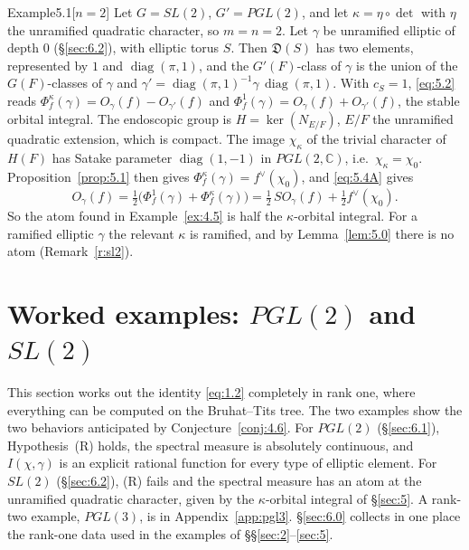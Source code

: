 \documentclass[12pt,letterpaper]{article}
\numberwithin{equation}{section}
\theoremstyle{plain}
\theoremstyle{remark}
\theoremstyle{plain}
\theoremstyle{definition}
\theoremstyle{remark}
\theoremstyle{remark}
\DeclareMathOperator{\diag}{diag}
\begin{document}
\begin{fixedrem}{Example}{5.1}[$n=2$]\label{ex:5.1}
Let $G=SL(2)$, $G'=PGL(2)$, and let $\kappa=\eta\circ\det$ with $\eta$ the unramified quadratic character, so $m=n=2$. Let $\gamma$ be unramified elliptic of depth $0$ (\S\ref{sec:6.2}), with elliptic torus $S$. Then $\mathfrak D(S)$ has two elements, represented by $1$ and $\diag(\pi,1)$, and the $G'(F)$-class of $\gamma$ is the union of the $G(F)$-classes of $\gamma$ and $\gamma'=\diag(\pi,1)^{-1}\gamma\,\diag(\pi,1)$. With $c_S=1$, \eqref{eq:5.2} reads $\Phi^\kappa_f(\gamma)=O_\gamma(f)-O_{\gamma'}(f)$ and $\Phi^1_f(\gamma)=O_\gamma(f)+O_{\gamma'}(f)$, the stable orbital integral. The endoscopic group is $H=\ker(N_{E/F})$, $E/F$ the unramified quadratic extension, which is compact. The image $\chi_\kappa$ of the trivial character of $H(F)$ has Satake parameter $\diag(1,-1)$ in $PGL(2,\mathbb{C})$, i.e.\ $\chi_\kappa=\chi_0$. Proposition~\ref{prop:5.1} then gives $\Phi^\kappa_f(\gamma)=f^\vee(\chi_0)$, and \eqref{eq:5.4A} gives
\[
O_\gamma(f)=\tfrac12\big(\Phi^1_f(\gamma)+\Phi^\kappa_f(\gamma)\big)=\tfrac12\,SO_\gamma(f)+\tfrac12f^\vee(\chi_0).
\]
So the atom found in Example~\ref{ex:4.5} is half the $\kappa$-orbital integral. For a ramified elliptic $\gamma$ the relevant $\kappa$ is ramified, and by Lemma~\ref{lem:5.0} there is no atom (Remark~\ref{r:sl2}).
\end{fixedrem}

\section{Worked examples: \texorpdfstring{$PGL(2)$}{PGL(2)} and \texorpdfstring{$SL(2)$}{SL(2)}}\label{sec:6}

This section works out the identity \eqref{eq:1.2} completely in rank one, where everything can be computed on the Bruhat--Tits tree. The two examples show the two behaviors anticipated by Conjecture~\ref{conj:4.6}. For $PGL(2)$ (\S\ref{sec:6.1}), Hypothesis~(R) holds, the spectral measure is absolutely continuous, and $I(\chi,\gamma)$ is an explicit rational function for every type of elliptic element. For $SL(2)$ (\S\ref{sec:6.2}), (R) fails and the spectral measure has an atom at the unramified quadratic character, given by the $\kappa$-orbital integral of \S\ref{sec:5}. A rank-two example, $PGL(3)$, is in Appendix~\ref{app:pgl3}. \S\ref{sec:6.0} collects in one place the rank-one data used in the examples of \S\S\ref{sec:2}--\ref{sec:5}.
\end{document}
